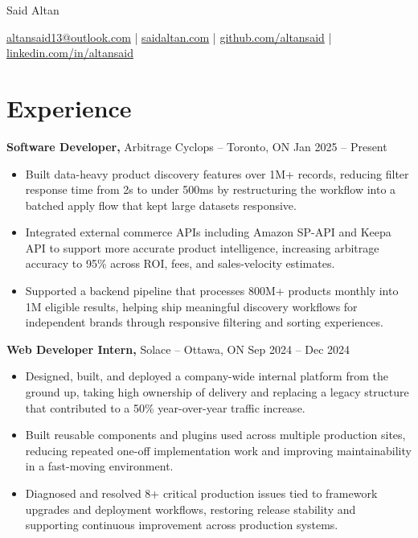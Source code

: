 \documentclass[11pt]{article}       %
\begin{document}
\centerline{\Huge Said Altan}

\vspace{10pt}

\centerline{\href{mailto:altansaid13@outlook.com}{altansaid13@outlook.com} | \href{https://saidaltan.com}{saidaltan.com} | \href{https://github.com/altansaid}{github.com/altansaid} | \href{https://www.linkedin.com/in/altansaid}{linkedin.com/in/altansaid}}


\vspace{5pt}
\section*{Experience}
\textbf{Software Developer,} {Arbitrage Cyclops} -- Toronto, ON \hfill Jan 2025 -- Present \\
\vspace{-9pt}
\begin{itemize}
  \item Built data-heavy product discovery features over 1M+ records, reducing filter response time from 2s to under 500ms by restructuring the workflow into a batched apply flow that kept large datasets responsive.
  \item Integrated external commerce APIs including Amazon SP-API and Keepa API to support more accurate product intelligence, increasing arbitrage accuracy to 95\% across ROI, fees, and sales-velocity estimates.
  \item Supported a backend pipeline that processes 800M+ products monthly into 1M eligible results, helping ship meaningful discovery workflows for independent brands through responsive filtering and sorting experiences.
\end{itemize}

\textbf{Web Developer Intern,} {Solace} -- Ottawa, ON \hfill Sep 2024 -- Dec 2024 \\
\vspace{-9pt}
\begin{itemize}
  \item Designed, built, and deployed a company-wide internal platform from the ground up, taking high ownership of delivery and replacing a legacy structure that contributed to a 50\% year-over-year traffic increase.
  \item Built reusable components and plugins used across multiple production sites, reducing repeated one-off implementation work and improving maintainability in a fast-moving environment.
  \item Diagnosed and resolved 8+ critical production issues tied to framework upgrades and deployment workflows, restoring release stability and supporting continuous improvement across production systems.
\end{itemize}
\end{document}
